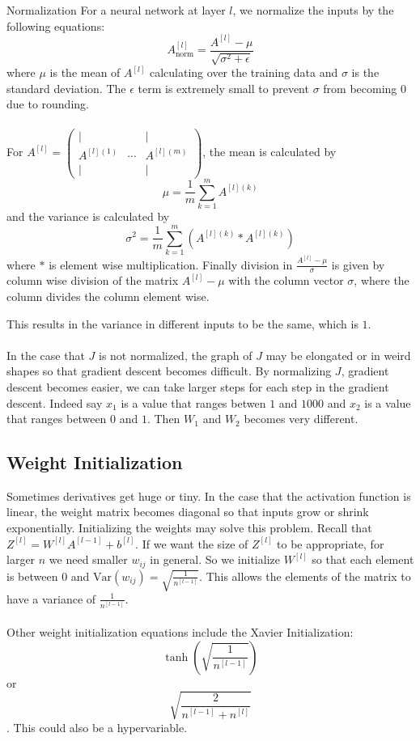 \documentclass[a4paper]{article}
\begin{document}
\begin{enumerate}
\begin{defn}{Normalization}{} For a neural network at layer $l$, we normalize the inputs by the following equations: $$A_{\text{norm}}^{[l]}=\frac{A^{[l]}-\mu}{\sqrt{\sigma^2+\epsilon}}$$ where $\mu$ is the mean of $A^{[l]}$ calculating over the training data and $\sigma$ is the standard deviation. The $\epsilon$ term is extremely small to prevent $\sigma$ from becoming $0$ due to rounding. \\~\\
For $A^{[l]}=\begin{pmatrix}
| & & |\\
A^{[l](1)} & \cdots & A^{[l](m)}\\
| & & |
\end{pmatrix}$, the mean is calculated by $$\mu=\frac{1}{m}\sum_{k=1}^mA^{[l](k)}$$ and the variance is calculated by $$\sigma^2=\frac{1}{m}\sum_{k=1}^m(A^{[l](k)}\ast A^{[l](k)})$$ where $\ast$ is element wise multiplication. Finally division in $\frac{A^{[l]}-\mu}{\sigma}$ is given by column wise division of the matrix $A^{[l]}-\mu$ with the column vector $\sigma$, where the column divides the column element wise. 
\end{defn}

This results in the variance in different inputs to be the same, which is $1$. \\~\\
In the case that $J$ is not normalized, the graph of $J$ may be elongated or in weird shapes so that gradient descent becomes difficult. By normalizing $J$, gradient descent becomes easier, we can take larger steps for each step in the gradient descent. Indeed say $x_1$ is a value that ranges betwen $1$ and $1000$ and $x_2$ is a value that ranges between $0$ and $1$. Then $W_1$ and $W_2$ becomes very different. 

\subsection{Weight Initialization}
Sometimes derivatives get huge or tiny. In the case that the activation function is linear, the weight matrix becomes diagonal so that inputs grow or shrink exponentially. Initializing the weights may solve this problem. Recall that $Z^{[l]}=W^{[l]}A^{[l-1]}+b^{[l]}$. If we want the size of $Z^{[l]}$ to be appropriate, for larger $n$ we need smaller $w_{ij}$ in general. So we initialize $W^{[l]}$ so that each element is between $0$ and $\text{Var}(w_{ij})=\sqrt{\frac{1}{n^{[l-1]}}}$. This allows the elements of the matrix to have a variance of $\frac{1}{n^{[l-1]}}$. \\~\\
Other weight initialization equations include the Xavier Initialization: $$\tanh(\sqrt{\frac{1}{n^{[l-1]}}})$$ or $$\sqrt{\frac{2}{n^{[l-1]}+n^{[l]}}}$$. This could also be a hypervariable. 


\end{enumerate}
\end{document}
